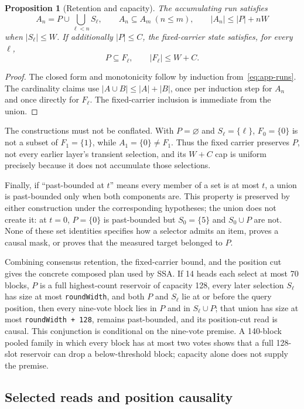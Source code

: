 \documentclass[11pt]{article}
\numberwithin{equation}{section}
\newtheorem{proposition}{Proposition}
\begin{document}
\begin{proposition}[Retention and capacity]\label{prop:app-carrier}
The accumulating run satisfies
\[
A_n=P\cup\bigcup_{\ell<n}S_\ell,
\qquad A_n\subseteq A_m\ (n\le m),
\qquad |A_n|\le|P|+nW
\]
when $|S_\ell|\le W$. If additionally $|P|\le C$, the fixed-carrier state satisfies, for every $\ell$,
\[
P\subseteq F_\ell,
\qquad |F_\ell|\le W+C.
\]
\end{proposition}
\begin{proof}
The closed form and monotonicity follow by induction from~\eqref{eq:app-runs}. The cardinality claims use
$|A\cup B|\le|A|+|B|$, once per induction step for $A_n$ and once directly for $F_\ell$. The fixed-carrier
inclusion is immediate from the union.
\end{proof}

The constructions must not be conflated. With $P=\varnothing$ and $S_\ell=\{\ell\}$,
$F_0=\{0\}$ is not a subset of $F_1=\{1\}$, while $A_1=\{0\}\ne F_1$. Thus the fixed carrier preserves
$P$, not every earlier layer's transient selection, and its $W+C$ cap is uniform precisely because it does not
accumulate those selections.

Finally, if ``past-bounded at $t$'' means every member of a set is at most $t$, a union is past-bounded only
when both components are. This property is preserved by either construction under the corresponding
hypotheses; the union does not create it: at $t=0$, $P=\{0\}$ is past-bounded but $S_0=\{5\}$ and
$S_0\cup P$ are not. None of these set identities specifies how a selector admits an item, proves a causal
mask, or proves that the measured target belonged to $P$.

Combining consensus retention, the fixed-carrier bound, and the position cut gives the concrete composed
plan used by SSA. If 14 heads each select at most 70 blocks, $P$ is a full highest-count reservoir of capacity
128, every later selection $S_\ell$ has size at most \texttt{roundWidth}, and both $P$ and $S_\ell$ lie at or
before the query position, then every nine-vote block lies in $P$ and in $S_\ell\cup P$; that union has size
at most \texttt{roundWidth + 128}, remains past-bounded, and its position-cut read is causal. This conjunction
is conditional on the nine-vote premise. A 140-block pooled family in which every block has at most two votes
shows that a full 128-slot reservoir can drop a below-threshold block; capacity alone does not supply the
premise.

\subsection{Selected reads and position causality}
\end{document}
